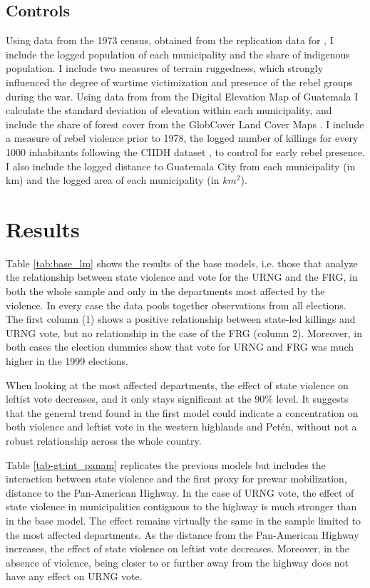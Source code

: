 \documentclass[12pt, notitlepage]{article}
\begin{document}
\subsection*{Controls}

Using data from the 1973 census, obtained from the replication data for \citet{Sullivan:2012aa}, I include the logged population of each municipality and the share of indigenous population.
I include two measures of terrain ruggedness, which strongly influenced the degree of wartime victimization and presence of the rebel groups during the war.
Using data from from the Digital Elevation Map of Guatemala \citep{Mapzen:2018aa} I calculate the standard deviation of elevation within each municipality, and include the share of forest cover from the GlobCover Land Cover Maps \citep{Arino:2012aa}.
I include a measure of rebel violence prior to 1978, the logged number of killings for every 1000 inhabitants following the CIIDH dataset \citep{Ball:1999aa}, to control for early rebel presence.
I also include the logged distance to Guatemala City from each municipality (in km) and the logged area of each municipality (in $km^2$).

\section*{Results}

Table \ref{tab:base_lm} shows the results of the base models, i.e. those that analyze the relationship between state violence and vote for the URNG and the FRG, in both the whole sample and only in the departments most affected by the violence.
In every case the data pools together observations from all elections.
The first column (1) shows a positive relationship between state-led killings and URNG vote, but no relationship in the case of the FRG (column 2).
Moreover, in both cases the election dummies show that vote for URNG and FRG was much higher in the 1999 elections.



When looking at the most affected departments, the effect of state violence on leftist vote decreases, and it only stays significant at the 90\% level.
It suggests that the general trend found in the first model could indicate a concentration on both violence and leftist vote in the western highlands and Petén, without not a robust relationship across the whole country.

Table \ref{tab-gt:int_panam} replicates the previous models but includes the interaction between state violence and the first proxy for prewar mobilization, distance to the Pan-American Highway.
In the case of URNG vote, the effect of state violence in municipalities contiguous to the highway is much stronger than in the base model.
The effect remains virtually the same in the sample limited to the most affected departments.
As the distance from the Pan-American Highway increases, the effect of state violence on leftist vote decreases.
Moreover, in the absence of violence, being closer to or further away from the highway does not have any effect on URNG vote.
\end{document}
